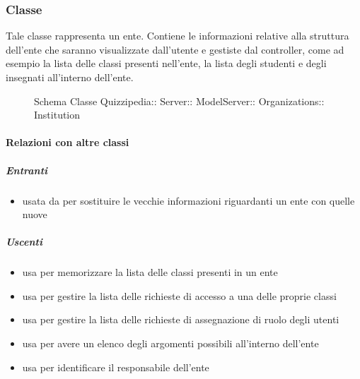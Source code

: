 \subsubsection{Classe }
Tale classe rappresenta un ente. Contiene le informazioni relative alla struttura dell'ente che saranno visualizzate dall'utente e gestiste dal controller, come ad esempio la lista delle classi presenti nell'ente, la lista degli studenti e degli insegnati all'interno dell'ente.
\begin{figure}[H]
\centering
\noindent{}
\caption[Schema Classe Institution]{Schema Classe Quizzipedia:: Server:: ModelServer:: Organizations:: Institution}
\end{figure}
\paragraph{Relazioni con altre classi}
\subparagraph{Entranti}
\begin{itemize}
\item usata da  per sostituire le vecchie informazioni riguardanti un ente con quelle nuove
\end{itemize}
\subparagraph{Uscenti}
\begin{itemize}
\item usa  per memorizzare la lista
delle classi presenti in un ente
\item usa  per gestire la lista delle richieste di accesso a una delle proprie classi
\item usa  per gestire la lista delle richieste di assegnazione di ruolo degli utenti
\item usa  per avere un elenco degli argomenti possibili all'interno dell'ente
\item usa  per identificare il responsabile dell'ente
\end{itemize}
